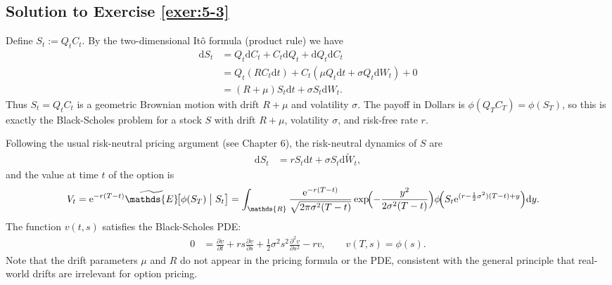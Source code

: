 \documentclass[12pt]{book}
\numberwithin{equation}{chapter}
\theoremstyle{plain}
\numberwithin{theorem}{section}
\theoremstyle{definition}
\numberwithin{exercise}{chapter}
\newcommand{\<}{\langle}
\renewcommand{\>}{\rangle}
\renewcommand{\(}{\left(}
\renewcommand{\)}{\right)}
\renewcommand{\[}{\left[}
\renewcommand{\]}{\right]}
\newcommand\Eb{\mathds{E}}
\newcommand\Rb{\mathds{R}}
\newcommand\sig{\sigma}
\newcommand\Ebt{\widetilde{\Eb}}
\newcommand\Wt{\widetilde{W}}
\renewcommand\d{\partial}
\newcommand\dd{\mathrm{d}}
\newcommand\ee{\mathrm{e}}
\theoremstyle{definition}
\numberwithin{question}{section}
\begin{document}

\subsection*{Solution to Exercise \ref{exer:5-3}}
Define $S_t := Q_t C_t$.  By the two-dimensional It\^o formula (product rule) we have
\begin{align}
\dd S_t
  &= Q_t \dd C_t + C_t \dd Q_t + \dd Q_t \dd C_t \\
  &= Q_t (R C_t \dd t) + C_t (\mu Q_t \dd t + \sig Q_t \dd W_t) + 0 \\
  &= (R + \mu) S_t \dd t + \sig S_t \dd W_t .
\end{align}
Thus $S_t = Q_t C_t$ is a geometric Brownian motion with drift $R+\mu$ and volatility $\sig$.  The payoff in Dollars is $\phi(Q_T C_T) = \phi(S_T)$, so this is exactly the Black-Scholes problem for a stock $S$ with drift $R+\mu$, volatility $\sig$, and risk-free rate $r$.

Following the usual risk-neutral pricing argument (see Chapter 6), the risk-neutral dynamics of $S$ are
\begin{align}
\dd S_t
  &= r S_t \dd t + \sig S_t \dd \Wt_t ,
\end{align}
and the value at time $t$ of the option is
\begin{align}
V_t
  &= \ee^{-r(T-t)} \Ebt\!\bigl[\phi(S_T) \bigm| S_t\bigr]
   = \int_\Rb \frac{\ee^{-r(T-t)}}{\sqrt{2\pi\sig^2(T-t)}}
       \exp\!\Bigl(-\frac{y^2}{2\sig^2(T-t)}\Bigr)
       \phi\!\Bigl(S_t \ee^{(r-\frac{1}{2}\sig^2)(T-t)+y}\Bigr)\dd y .
\end{align}
The function $v(t,s)$ satisfies the Black-Scholes PDE:
\begin{align}
0
  &= \frac{\d v}{\d t} + r s \frac{\d v}{\d s} + \frac{1}{2}\sig^2 s^2 \frac{\d^2 v}{\d s^2} - r v , \qquad v(T,s) = \phi(s) .
\end{align}
Note that the drift parameters $\mu$ and $R$ do not appear in the pricing formula or the PDE, consistent with the general principle that real-world drifts are irrelevant for option pricing.

\end{document}
